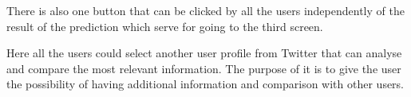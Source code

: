 There is also one button that can be clicked by all the users independently of the result of the prediction which serve for going to the third screen.

Here all the users could select another user profile from Twitter that can analyse and compare the most relevant information. The purpose of it is to give the user the possibility of having additional information and comparison with other users.





